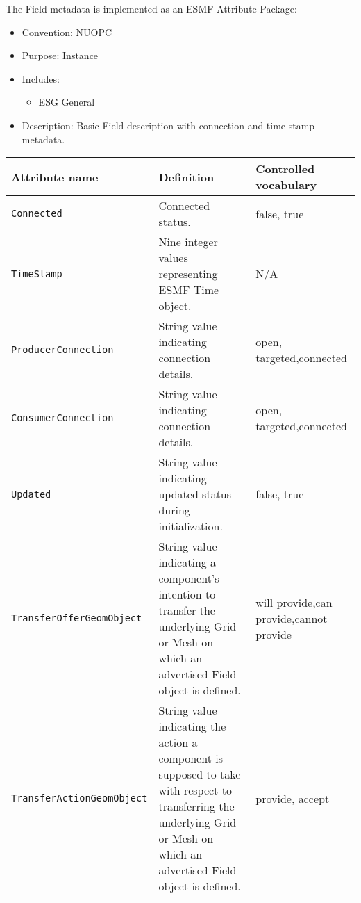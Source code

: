 \label{FieldMeta}
The Field metadata is implemented as an ESMF Attribute Package:

\begin{itemize}
    \item Convention: NUOPC
    \item Purpose: Instance
    \item Includes:
    \begin{itemize}
        \item ESG General
    \end{itemize} 
    \item Description: Basic Field description with connection and time stamp metadata. 
\end{itemize}

\begin{tabular}{|p{5cm}|p{5cm}|p{35mm}|}
     \hline\hline
     {\bf Attribute name} & {\bf Definition} & {\bf Controlled vocabulary}\\
     \hline\hline
     {\tt Connected} & Connected status.& false, true\\ \hline
     {\tt TimeStamp} & Nine integer values representing ESMF Time object.& N/A\\ \hline
     {\tt ProducerConnection} & String value indicating connection details.& open, targeted,\newline connected\\ \hline
     {\tt ConsumerConnection} & String value indicating connection details.& open, targeted,\newline connected\\ \hline
     {\tt Updated} & String value indicating updated status during initialization.& false, true\\ \hline
     {\tt TransferOfferGeomObject} & String value indicating a component's intention to transfer the underlying Grid or Mesh on which an advertised Field object is defined.& will provide,\newline can provide,\newline cannot provide\\ \hline
     {\tt TransferActionGeomObject} & String value indicating the action a component is supposed to take with respect to transferring the underlying Grid or Mesh on which an advertised Field object is defined.& provide, accept\\ \hline
     \hline
\end{tabular}
